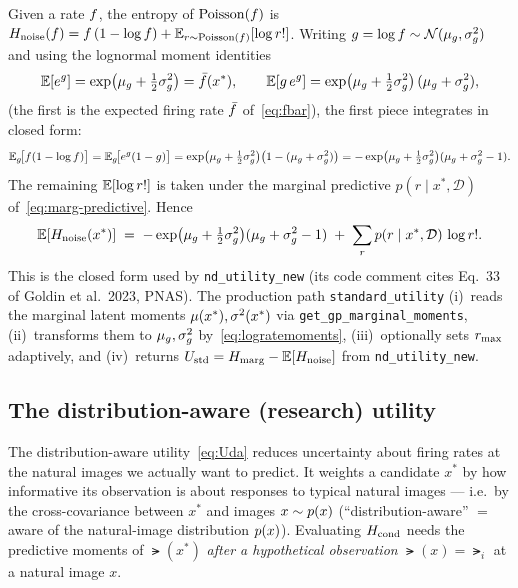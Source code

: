 Given a rate $f$, the entropy of $\mathrm{Poisson}(f)$ is
$H_{\mathrm{noise}}(f)=f\,(1-\log f)+\mathbb{E}_{r\sim\mathrm{Poisson}(f)}[\log r!]$. Writing
$g=\log f\sim\mathcal{N}(\mu_{g},\sigma_{g}^{2})$ and using the lognormal moment identities
%
\begin{equation}
  \mathbb{E}[e^{g}] = \exp\!\big(\mu_{g}+\tfrac12\sigma_{g}^{2}\big) = \bar{f}(x^{*}),
  \qquad
  \mathbb{E}[g\,e^{g}] = \exp\!\big(\mu_{g}+\tfrac12\sigma_{g}^{2}\big)\,(\mu_{g}+\sigma_{g}^{2}),
  \label{eq:lognormal-identities}
\end{equation}
%
(the first is the expected firing rate $\bar{f}$ of~\eqref{eq:fbar}), the first
piece integrates in closed form:
%
\begin{equation}
  \mathbb{E}_{g}\!\big[f(1-\log f)\big]
  = \mathbb{E}_{g}\!\big[e^{g}(1-g)\big]
  = \exp\!\big(\mu_{g}+\tfrac12\sigma_{g}^{2}\big)\big(1-(\mu_{g}+\sigma_{g}^{2})\big)
  = -\exp\!\big(\mu_{g}+\tfrac12\sigma_{g}^{2}\big)(\mu_{g}+\sigma_{g}^{2}-1).
  \label{eq:hnoise-firstpiece}
\end{equation}
%
The remaining $\mathbb{E}[\log r!]$ is taken under the marginal predictive
$p(r\mid x^{*},\mathcal D)$ of~\eqref{eq:marg-predictive}. Hence
%
\begin{equation}
  \mathbb{E}[H_{\mathrm{noise}}(x^{*})]
  \;=\; -\exp\!\big(\mu_{g}+\tfrac12\sigma_{g}^{2}\big)(\mu_{g}+\sigma_{g}^{2}-1)
        \;+\; \sum_{r} p(r\mid x^{*},\mathcal D)\,\log r! .
  \label{eq:Hnoise}
\end{equation}
%
This is the closed form used by \texttt{nd\_utility\_new} (its code comment cites
Eq.~33 of Goldin et al.\ 2023, PNAS). The production path
\texttt{standard\_utility} (i)~reads the marginal latent moments
$\mu(x^{*}),\sigma^{2}(x^{*})$ via \texttt{get\_gp\_marginal\_moments},
(ii)~transforms them to $\mu_{g},\sigma_{g}^{2}$ by~\eqref{eq:logratemoments},
(iii)~optionally sets $r_{\max}$ adaptively, and (iv)~returns
$U_{\mathrm{std}}=H_{\mathrm{marg}}-\mathbb{E}[H_{\mathrm{noise}}]$ from \texttt{nd\_utility\_new}.

\subsection{The distribution-aware (research) utility}
\label{subsec:da}

The distribution-aware utility~\eqref{eq:Uda} reduces uncertainty about firing
rates at the natural images we actually want to predict. It weights a candidate
$x^{*}$ by how informative its observation is about responses to typical natural
images --- i.e.\ by the cross-covariance between $x^{*}$ and images $x\sim p(x)$
(``distribution-aware'' $=$ aware of the natural-image distribution $p(x)$).
Evaluating $H_{\mathrm{cond}}$ needs the predictive moments of $\lat(x^{*})$ \emph{after a
hypothetical observation} $\lat(x)=\lat_i$ at a natural image $x$.

